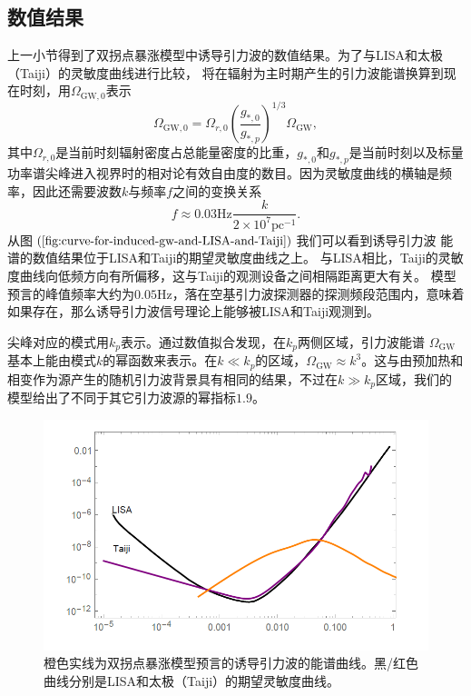 \subsection{数值结果}
上一小节得到了双拐点暴涨模型中诱导引力波的数值结果。为了与LISA\citep{amaro2017laser}和太极（Taiji）\citep{guo2018taiji}的灵敏度曲线进行比较，
将在辐射为主时期产生的引力波能谱换算到现在时刻，用$\Omega_{\text{GW},0}$表示
\begin{equation}
  \label{eq:energy-spectrum-of-GW-at-now}
  \Omega_{\text{GW},0} =
  \Omega_{r,0}{\left(\frac{g_{*,0}}{g_{*,p}}\right)}^{1
  /3}\Omega_{\text{GW}},
\end{equation}
其中$\Omega_{r,0}$是当前时刻辐射密度占总能量密度的比重，$g_{*,0}$和$g_{*,p}$是当前时刻以及标量功率谱尖峰进入视界时的相对论有效自由度的数目。因为灵敏度曲线的横轴是频率，因此还需要波数$k$与频率$f$之间的变换关系
\begin{equation}
  \label{eq:frequency-from-wave-numbers}
  f \approx 0.03\mathrm{Hz} \frac{k}{2\times 10^{7}\text{pc}^{-1}}.
\end{equation}
从图$(\ref{fig:curve-for-induced-gw-and-LISA-and-Taiji})$我们可以看到诱导引力波
能谱的数值结果位于LISA\citep{amaro2017laser}和Taiji\citep{guo2018taiji}的期望灵敏度曲线之上。
与LISA相比，Taiji的灵敏度曲线向低频方向有所偏移，这与Taiji的观测设备之间相隔距离更大有关。
模型预言的峰值频率大约为$0.05\text{Hz}$，落在空基引力波探测器的探测频段范围内，意味着如果存在，那么诱导引力波信号理论上能够被LISA和Taiji观测到。

尖峰对应的模式用$k_{p}$表示。通过数值拟合发现，在$k_{p}$两侧区域，引力波能谱
$\Omega_{\text{GW}}$基本上能由模式$k$的幂函数来表示。在$k\ll
k_{p}$的区域，$\Omega_{\text{GW}}\approx
k^3$。这与由预加热和相变作为源产生的随机引力波背景具有相同的结果，不过在$k\gg
k_{p}$区域，我们的模型给出了不同于其它引力波源的幂指标$1.9$。

\begin{figure}[!htbp]
  \centering
  \includegraphics[width=6in]{Img/Lisa2.png}
  \caption{橙色实线为双拐点暴涨模型预言的诱导引力波的能谱曲线。黑/红色曲线分别是LISA\citep{amaro2017laser}和太极（Taiji）\citep{guo2018taiji}的期望灵敏度曲线。}\label{fig:curve-for-induced-gw-and-LISA-and-Taiji}
\end{figure}

